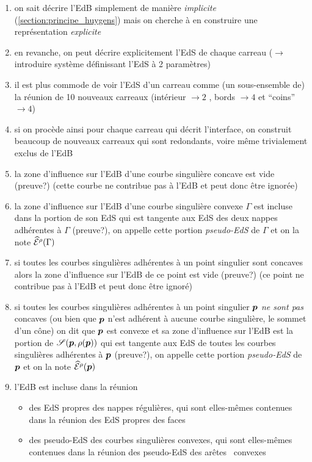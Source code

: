 \begin{enumerate}
	\item on sait décrire l'EdB simplement de manière \textit{implicite} (\cf \autoref{section:principe_huygens}) mais on cherche à en construire une représentation \textit{explicite}
	\item en revanche, on peut décrire explicitement l'EdS de chaque carreau ($\to$ introduire système définissant l'EdS à 2 paramètres)
	\item il est plus commode de voir l'EdS d'un carreau comme (un sous-ensemble de) la réunion de 10 nouveaux carreaux (intérieur $\to 2$ , bords $\to 4$ et ``coins'' $\to 4$)
	\item si on procède ainsi pour chaque carreau qui décrit l'interface, on construit beaucoup de nouveaux carreaux qui sont redondants, voire même trivialement exclus de l'EdB
	\item la zone d'influence sur l'EdB d'une courbe singulière concave est vide (preuve?) (\ie cette courbe ne contribue pas à l'EdB et peut donc être ignorée)
	\item la zone d'influence sur l'EdB d'une courbe singulière convexe $\Gamma$ est incluse dans la portion de son EdS qui est tangente aux EdS des deux nappes adhérentes à $\Gamma$ (preuve?), on appelle cette portion \textit{pseudo-EdS} de $\Gamma$ et on la note $\widehat{\mathcal{E}}^{\rho}({\Gamma})$
	\item si toutes les courbes singulières adhérentes à un point singulier sont concaves alors la zone d'influence sur l'EdB de ce point est vide (preuve?) (\ie ce point ne contribue pas à l'EdB et peut donc être ignoré)
	\item si toutes les courbes singulières adhérentes à un point singulier $\boldsymbol{p}$ \textit{ne sont pas} concaves (ou bien que $\boldsymbol{p}$ n'est adhérent à aucune courbe singulière, \eg le sommet d'un cône) on dit que $\boldsymbol{p}$ est convexe et sa zone d'influence sur l'EdB est la portion de $\sphere[\p][\rho(\p)]$ qui est tangente aux EdS de toutes les courbes singulières adhérentes à $\boldsymbol{p}$ (preuve?), on appelle cette portion \textit{pseudo-EdS} de $\boldsymbol{p}$ et on la note $\widehat{\mathcal{E}}^{\rho}({\boldsymbol{p}})$
	\item l'EdB est incluse dans la réunion
	\begin{itemize}
		\item des EdS propres des nappes régulières, qui sont elles-mêmes contenues dans la réunion des EdS propres des faces \brep
		\item des pseudo-EdS des courbes singulières convexes, qui sont elles-mêmes contenues dans la réunion des pseudo-EdS des arêtes \brep\ convexes

\end{itemize}
\end{enumerate}
